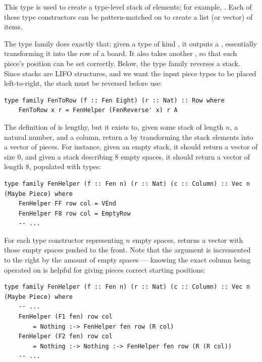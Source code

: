 \enlargethispage{\baselineskip}  %

This  type is used to create a type-level stack of elements; for example, . Each of these  type constructors can be pattern-matched on to create a list (or vector) of items.

The type family  does exactly that; given a type of kind , it outputs a , essentially transforming it into the row of a board. It also takes another , so that each piece's position can be set correctly. Below, the type family  reverses a  stack. Since stacks are LIFO structures, and we want the input piece types to be placed left-to-right, the stack must be reversed before use:

\begin{lstlisting}
type family FenToRow (f :: Fen Eight) (r :: Nat) :: Row where
    FenToRow x r = FenHelper (FenReverse' x) r A
\end{lstlisting}

The definition of  is lengthy, but it exists to, given some  stack of length $n$, a natural number, and a column, return a  by transforming the stack elements into a vector of pieces. For instance, given an empty stack, it should return a vector of size 0, and given a stack describing 8 empty spaces, it should return a vector of length 8, populated with  types:

\begin{lstlisting}
type family FenHelper (f :: Fen n) (r :: Nat) (c :: Column) :: Vec n (Maybe Piece) where
    FenHelper FF row col = VEnd
    FenHelper F8 row col = EmptyRow
    -- ...
\end{lstlisting}

For each type constructor representing $n$ empty spaces,  returns a vector with those empty spaces pushed to the front. Note that the  argument is incremented to the right by the amount of empty spaces --- knowing the exact column being operated on is helpful for giving pieces correct starting positions:

\begin{lstlisting}
type family FenHelper (f :: Fen n) (r :: Nat) (c :: Column) :: Vec n (Maybe Piece) where
    -- ...
    FenHelper (F1 fen) row col
        = Nothing :-> FenHelper fen row (R col)
    FenHelper (F2 fen) row col
        = Nothing :-> Nothing :-> FenHelper fen row (R (R col))
    -- ...
\end{lstlisting}

